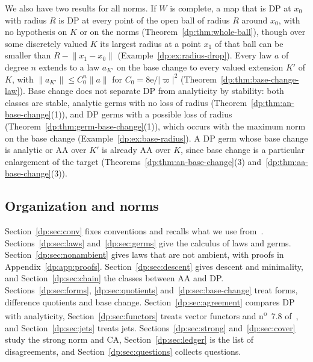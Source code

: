 \documentclass[11pt]{amsart}
\theoremstyle{definition}
\theoremstyle{remark}
\numberwithin{equation}{section}
\newcommand{\abs}[1]{\lvert #1\rvert}
\newcommand{\norm}[1]{\lVert #1\rVert}
\theoremstyle{plain}
\theoremstyle{definition}
\theoremstyle{plain}
\begin{document}
We also have two results for all norms. If $W$ is complete, a map that is DP at $x_0$ with radius $R$ is DP at every point of the open ball of radius $R$ around $x_0$, with no hypothesis on $K$ or on the norms (Theorem~\ref{dp:thm:whole-ball}), though over some discretely valued $K$ its largest radius at a point $x_1$ of that ball can be smaller than $R-\norm{x_1-x_0}$ (Example~\ref{dp:ex:radius-drop}). Every law $a$ of degree $n$ extends to a law $a_{K'}$ on the base change to every valued extension $K'$ of $K$, with $\norm{a_{K'}}\le C_0^n\norm a$ for $C_0=8\mathrm e/\abs\varpi^2$ (Theorem~\ref{dp:thm:base-change-law}). Base change does not separate DP from analyticity by stability: both classes are stable, analytic germs with no loss of radius (Theorem~\ref{dp:thm:an-base-change}(1)), and DP germs with a possible loss of radius (Theorem~\ref{dp:thm:germ-base-change}(1)), which occurs with the maximum norm on the base change (Example~\ref{dp:ex:base-radius}). A DP germ whose base change is analytic or AA over $K'$ is already AA over $K$, since base change is a particular enlargement of the target (Theorems~\ref{dp:thm:an-base-change}(3) and~\ref{dp:thm:aa-base-change}(3)).

\subsection*{Organization and norms}

Section~\ref{dp:sec:conv} fixes conventions and recalls what we use from~\cite{I}. Sections~\ref{dp:sec:laws} and~\ref{dp:sec:germs} give the calculus of laws and germs. Section~\ref{dp:sec:nonambient} gives laws that are not ambient, with proofs in Appendix~\ref{dp:app:proofs}. Section~\ref{dp:sec:descent} gives descent and minimality, and Section~\ref{dp:sec:chain} the classes between AA and DP. Sections~\ref{dp:sec:forms}, \ref{dp:sec:quotients} and~\ref{dp:sec:base-change} treat forms, difference quotients and base change. Section~\ref{dp:sec:agreement} compares DP with analyticity, Section~\ref{dp:sec:functors} treats vector functors and n\textsuperscript{o}~7.8 of~\cite{Bou}, and Section~\ref{dp:sec:jets} treats jets. Sections~\ref{dp:sec:strong} and~\ref{dp:sec:cover} study the strong norm and CA, Section~\ref{dp:sec:ledger} is the list of disagreements, and Section~\ref{dp:sec:questions} collects questions.
\end{document}
